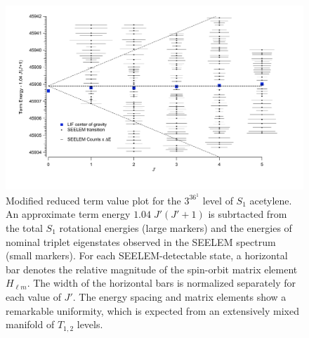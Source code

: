 \documentclass[12pt]{mitthesis}
\begin{document}

\begin{figure}
  \caption{Modified reduced term value plot for the $3^36^1$ 
    level of $S_1$ acetylene.  An approximate term energy $1.04 \;
    J'(J'+1)$ is subrtacted from the total $S_1$ rotational energies
    (large markers) and the energies of nominal triplet eigenstates
    observed in the SEELEM spectrum (small markers).  For each
    SEELEM-detectable state, a horizontal bar denotes the relative
    magnitude of the spin-orbit matrix element $H_{\ell m}$.  The
    width of the horizontal bars is normalized separately for each
    value of $J'$.  The energy spacing and matrix elements show a
    remarkable uniformity, which is expected from an extensively mixed
    manifold of $T_{1,2}$ levels.}
  \label{fig:unfold}
  \centering
  \vspace{15mm}
  \includegraphics[width=7in, trim=10mm 0mm 50mm 0mm, angle=90]{redterms-3361-unfolded}
\end{figure}

\end{document}
